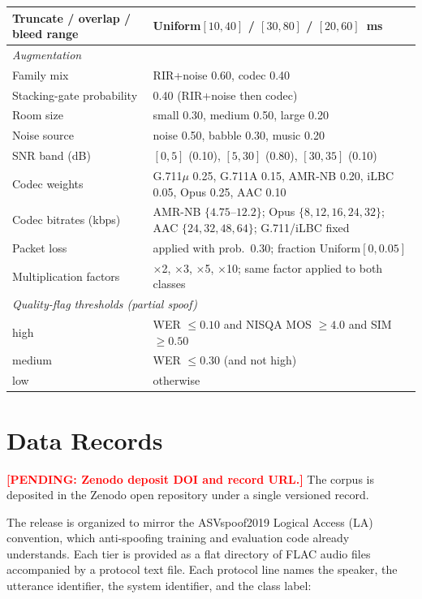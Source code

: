 \documentclass[11pt]{article}
\newcommand{\PENDING}[1]{\textcolor{red}{\textbf{[PENDING: #1]}}}
\begin{document}
\begin{table}[t]
\begin{tabular}{p{4.9cm}p{6.6cm}}
Truncate / overlap / bleed range & Uniform$[10,40]$ / $[30,80]$ / $[20,60]$~ms \\
\midrule
\multicolumn{2}{l}{\emph{Augmentation}} \\
\midrule
Family mix & RIR+noise 0.60, codec 0.40 \\
Stacking-gate probability & 0.40 (RIR+noise then codec) \\
Room size & small 0.30, medium 0.50, large 0.20 \\
Noise source & noise 0.50, babble 0.30, music 0.20 \\
SNR band (dB) & $[0,5]$ (0.10), $[5,30]$ (0.80), $[30,35]$ (0.10) \\
Codec weights & G.711$\mu$ 0.25, G.711A 0.15, AMR-NB 0.20, iLBC 0.05, Opus 0.25, AAC 0.10 \\
Codec bitrates (kbps) & AMR-NB $\{4.75\text{--}12.2\}$; Opus $\{8,12,16,24,32\}$; AAC $\{24,32,48,64\}$; G.711/iLBC fixed \\
Packet loss & applied with prob.\ 0.30; fraction Uniform$[0,0.05]$ \\
Multiplication factors & $\times$2, $\times$3, $\times$5, $\times$10; same factor applied to both classes \\
\midrule
\multicolumn{2}{l}{\emph{Quality-flag thresholds (partial spoof)}} \\
\midrule
high & WER $\leq 0.10$ and NISQA MOS $\geq 4.0$ and SIM $\geq 0.50$ \\
medium & WER $\leq 0.30$ (and not high) \\
low & otherwise \\
\bottomrule
\end{tabular}
\end{table}

\section*{Data Records}

\PENDING{Zenodo deposit DOI and record URL.} The corpus is deposited in
the Zenodo open repository under a single versioned record.

The release is organized to mirror the ASVspoof2019 Logical Access (LA)
convention, which anti-spoofing training and evaluation code already
understands. Each tier is provided as a flat directory of FLAC audio
files accompanied by a protocol text file. Each protocol line names the
speaker, the utterance identifier, the system identifier, and the
class label:
\end{document}
